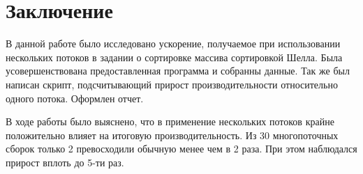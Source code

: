 \documentclass[a4paper, 12pt]{article}
\begin{document}




\section{Заключение}

В данной работе было исследовано ускорение, получаемое при использовании нескольких потоков в задании о сортировке массива сортировкой Шелла.
Была усовершенствована предоставленная программа и собранны данные.
Так же был написан скрипт, подсчитывающий прирост производительности относительно одного потока.
Оформлен отчет.

В ходе работы было выяснено, что в применение нескольких потоков крайне положительно влияет на итоговую производительность.
Из 30 многопоточных сборок только 2 превосходили обычную менее чем в 2 раза.
При этом наблюдался прирост вплоть до 5-ти раз.


\end{document}
